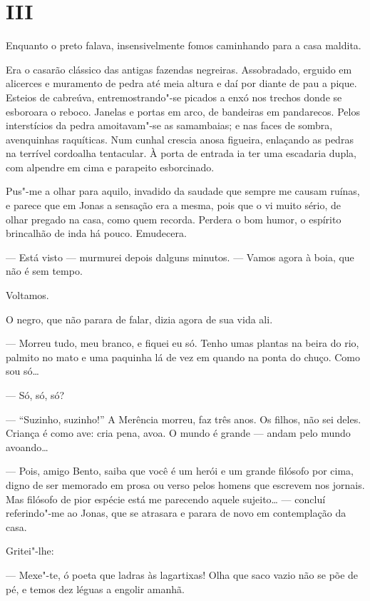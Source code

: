 \section*{III}

Enquanto o preto falava, insensivelmente fomos caminhando para a casa
maldita.

Era o casarão clássico das antigas fazendas negreiras. Assobradado,
erguido em alicerces e muramento de pedra até meia altura e daí por
diante de pau a pique. Esteios de cabreúva, entremostrando"-se picados a
enxó nos trechos donde se esboroara o reboco. Janelas e portas em arco,
de bandeiras em pandarecos. Pelos interstícios da pedra amoitavam"-se as
samambaias; e nas faces de sombra, avenquinhas raquíticas. Num cunhal
crescia anosa figueira, enlaçando as pedras na terrível cordoalha
tentacular. À porta de entrada ia ter uma escadaria dupla, com alpendre
em cima e parapeito esborcinado.

Pus"-me a olhar para aquilo, invadido da saudade que sempre me causam
ruínas, e parece que em Jonas a sensação era a mesma, pois que o vi
muito sério, de olhar pregado na casa, como quem recorda. Perdera o bom
humor, o espírito brincalhão de inda há pouco. Emudecera.

--- Está visto --- murmurei depois dalguns minutos. --- Vamos agora à
boia, que não é sem tempo.

Voltamos.

O negro, que não parara de falar, dizia agora de sua vida ali.

--- Morreu tudo, meu branco, e fiquei eu só. Tenho umas plantas na beira
do rio, palmito no mato e uma paquinha lá de vez em quando na ponta do
chuço. Como sou só\ldots{}

--- Só, só, só?

--- ``Suzinho, suzinho!'' A Merência morreu, faz três anos. Os filhos,
não sei deles. Criança é como ave: cria pena, avoa. O mundo é grande ---
andam pelo mundo avoando\ldots{}

--- Pois, amigo Bento, saiba que você é um herói e um grande filósofo
por cima, digno de ser memorado em prosa ou verso pelos homens que
escrevem nos jornais. Mas filósofo de pior espécie está me parecendo
aquele sujeito\ldots{} --- concluí referindo"-me ao Jonas, que se atrasara e
parara de novo em contemplação da casa.

Gritei"-lhe:

--- Mexe"-te, ó poeta que ladras às lagartixas! Olha que saco vazio não
se põe de pé, e temos dez léguas a engolir amanhã.

